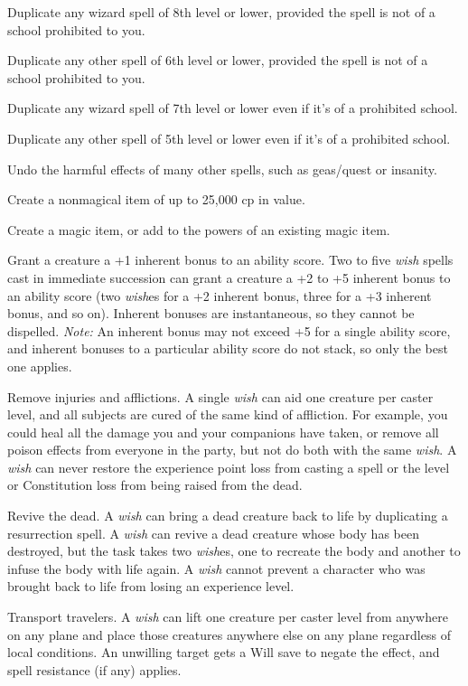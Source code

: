 {	\begin{itemize*}
	\item Duplicate any wizard spell of 8th level or lower, provided the spell is not of a school prohibited to you.
	\item Duplicate any other spell of 6th level or lower, provided the spell is not of a school prohibited to you.
	\item Duplicate any wizard spell of 7th level or lower even if it's of a prohibited school.
	\item Duplicate any other spell of 5th level or lower even if it's of a prohibited school.
	\item Undo the harmful effects of many other spells, such as geas/quest or insanity.
	\item Create a nonmagical item of up to 25,000 cp in value.
	\item Create a magic item, or add to the powers of an existing magic item.
	\item Grant a creature a +1 inherent bonus to an ability score. Two to five \emph{wish} spells cast in immediate succession can grant a creature a +2 to +5 inherent bonus to an ability score (two \emph{wish}es for a +2 inherent bonus, three for a +3 inherent bonus, and so on). Inherent bonuses are instantaneous, so they cannot be dispelled. \textit{Note:} An inherent bonus may not exceed +5 for a single ability score, and inherent bonuses to a particular ability score do not stack, so only the best one applies.
	\item Remove injuries and afflictions. A single \emph{wish} can aid one creature per caster level, and all subjects are cured of the same kind of affliction. For example, you could heal all the damage you and your companions have taken, or remove all poison effects from everyone in the party, but not do both with the same \emph{wish}. A \emph{wish} can never restore the experience point loss from casting a spell or the level or Constitution loss from being raised from the dead.
	\item Revive the dead. A \emph{wish} can bring a dead creature back to life by duplicating a resurrection spell. A \emph{wish} can revive a dead creature whose body has been destroyed, but the task takes two \emph{wish}es, one to recreate the body and another to infuse the body with life again. A \emph{wish} cannot prevent a character who was brought back to life from losing an experience level.
	\item Transport travelers. A \emph{wish} can lift one creature per caster level from anywhere on any plane and place those creatures anywhere else on any plane regardless of local conditions. An unwilling target gets a Will save to negate the effect, and spell resistance (if any) applies.

\end{itemize*}}
